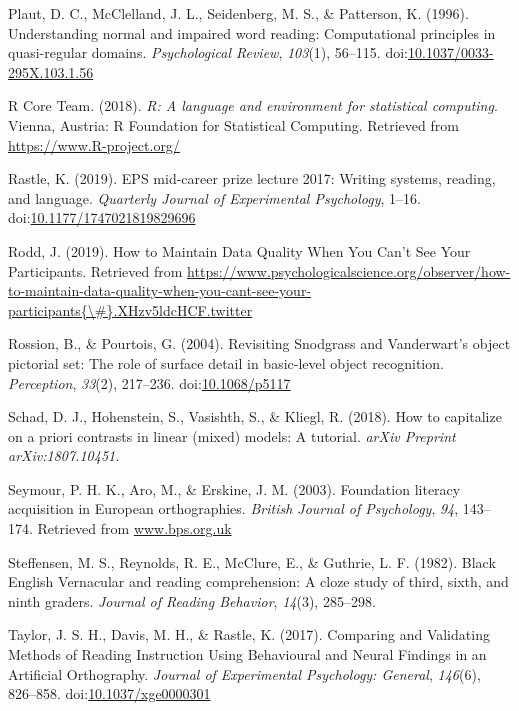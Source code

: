 \documentclass[doc,floatsintext]{apa6}
\begin{document}
\hypertarget{ref-Plaut1996}{}
Plaut, D. C., McClelland, J. L., Seidenberg, M. S., \& Patterson, K.
(1996). Understanding normal and impaired word reading: Computational
principles in quasi-regular domains. \emph{Psychological Review},
\emph{103}(1), 56--115.
doi:\href{https://doi.org/10.1037/0033-295X.103.1.56}{10.1037/0033-295X.103.1.56}

\hypertarget{ref-R-base}{}
R Core Team. (2018). \emph{R: A language and environment for statistical
computing}. Vienna, Austria: R Foundation for Statistical Computing.
Retrieved from \url{https://www.R-project.org/}

\hypertarget{ref-Rastle2019}{}
Rastle, K. (2019). EPS mid-career prize lecture 2017: Writing systems,
reading, and language. \emph{Quarterly Journal of Experimental
Psychology}, 1--16.
doi:\href{https://doi.org/10.1177/1747021819829696}{10.1177/1747021819829696}

\hypertarget{ref-Rodd2019}{}
Rodd, J. (2019). How to Maintain Data Quality When You Can't See Your
Participants. Retrieved from
\href{https://www.psychologicalscience.org/observer/how-to-maintain-data-quality-when-you-cant-see-your-participants\%7B/\#\%7D.XHzv5ldcHCF.twitter}{https://www.psychologicalscience.org/observer/how-to-maintain-data-quality-when-you-cant-see-your-participants\{\textbackslash{}\#\}.XHzv5ldcHCF.twitter}

\hypertarget{ref-Rossion2004}{}
Rossion, B., \& Pourtois, G. (2004). Revisiting Snodgrass and
Vanderwart's object pictorial set: The role of surface detail in
basic-level object recognition. \emph{Perception}, \emph{33}(2),
217--236. doi:\href{https://doi.org/10.1068/p5117}{10.1068/p5117}

\hypertarget{ref-Schad2018}{}
Schad, D. J., Hohenstein, S., Vasishth, S., \& Kliegl, R. (2018). How to
capitalize on a priori contrasts in linear (mixed) models: A tutorial.
\emph{arXiv Preprint arXiv:1807.10451.}

\hypertarget{ref-KSeymour2003}{}
Seymour, P. H. K., Aro, M., \& Erskine, J. M. (2003). Foundation
literacy acquisition in European orthographies. \emph{British Journal of
Psychology}, \emph{94}, 143--174. Retrieved from \url{www.bps.org.uk}

\hypertarget{ref-Steffensen1982}{}
Steffensen, M. S., Reynolds, R. E., McClure, E., \& Guthrie, L. F.
(1982). Black English Vernacular and reading comprehension: A cloze
study of third, sixth, and ninth graders. \emph{Journal of Reading
Behavior}, \emph{14}(3), 285--298.

\hypertarget{ref-Taylor2017}{}
Taylor, J. S. H., Davis, M. H., \& Rastle, K. (2017). Comparing and
Validating Methods of Reading Instruction Using Behavioural and Neural
Findings in an Artificial Orthography. \emph{Journal of Experimental
Psychology: General}, \emph{146}(6), 826--858.
doi:\href{https://doi.org/10.1037/xge0000301}{10.1037/xge0000301}
\end{document}
